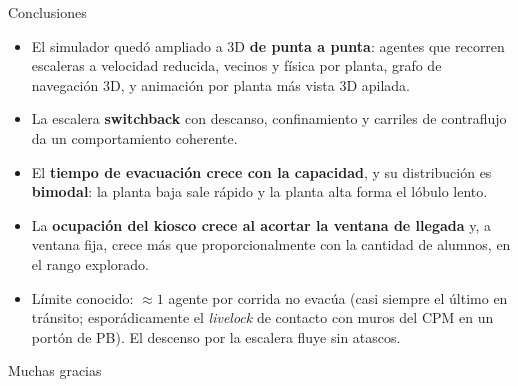 \documentclass[10pt,aspectratio=169,t]{beamer}
\begin{document}
\begin{frame}[c]{Conclusiones}
  \begin{itemize}
    \item El simulador quedó ampliado a 3D \textbf{de punta a punta}: agentes que
      recorren escaleras a velocidad reducida, vecinos y física por planta, grafo de
      navegación 3D, y animación por planta más vista 3D apilada.
    \item La escalera \textbf{switchback} con descanso, confinamiento y carriles de
      contraflujo da un comportamiento coherente.
    \item El \textbf{tiempo de evacuación crece con la capacidad}, y su distribución es
      \textbf{bimodal}: la planta baja sale rápido y la planta alta forma el lóbulo
      lento.
    \item La \textbf{ocupación del kiosco crece al acortar la ventana de llegada} y, a
      ventana fija, crece más que proporcionalmente con la cantidad de alumnos, en el
      rango explorado.
    \item Límite conocido: $\approx 1$ agente por corrida no evacúa (casi siempre el último
      en tránsito; esporádicamente el \emph{livelock} de contacto con muros del CPM en un
      portón de PB). El descenso por la escalera fluye sin atascos.
  \end{itemize}
\end{frame}

{
  \begin{frame}[plain,c]
    \centering
    {\fontsize{44}{52}\selectfont Muchas gracias\par}
  \end{frame}
}
\end{document}
